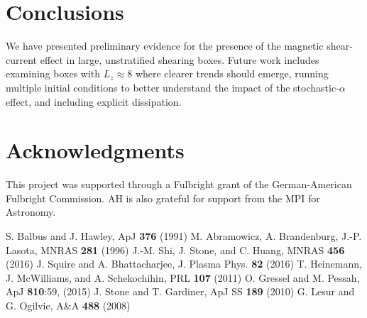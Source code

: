 \documentclass{epsconf}
\begin{document}
\section{Conclusions}
We have presented preliminary evidence for the presence of the magnetic shear-current effect in large, unstratified shearing boxes. Future work includes examining boxes with $L_z\approx8$ where clearer trends should emerge, running multiple initial conditions to better understand the impact of the stochastic-$\alpha$ effect, and including explicit dissipation. 
\section{Acknowledgments}
This project was supported through a Fulbright grant of the German-American Fulbright Commission. AH is also grateful for support from the MPI for Astronomy.

\begin{thebibliography}{99}
S. Balbus and J. Hawley, ApJ {\bf 376} (1991)
M. Abramowicz, A. Brandenburg, J.-P. Lasota, MNRAS {\bf 281} (1996)
J.-M. Shi, J. Stone, and C. Huang, MNRAS {\bf 456} (2016)
J. Squire and A. Bhattacharjee, J. Plasma Phys. {\bf 82} (2016)
T. Heinemann, J. McWilliams, and A. Schekochihin, PRL {\bf 107} (2011)
O. Gressel and M. Pessah, ApJ {\bf 810}:59, (2015)
J. Stone and T. Gardiner, ApJ SS {\bf 189} (2010)
G. Lesur and G. Ogilvie, A\&A {\bf 488} (2008)
\end{thebibliography}
\end{document}
